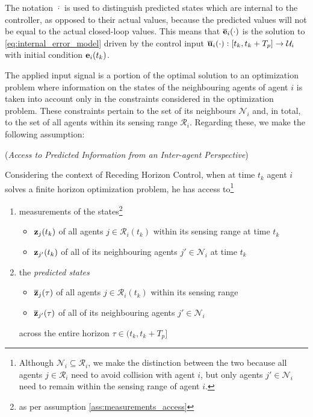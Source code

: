 The notation $\overline{\cdot}$ is used to distinguish predicted states which
are internal to the controller, as opposed to their actual values, because
the predicted values will not be equal to the actual closed-loop values. This
means that $\overline{\bm{\mathbf{e}}}_i(\cdot)$ is the solution to
\eqref{eq:internal_error_model} driven by the control input
$\overline{\bm{\mathbf{u}}}_i(\cdot) : [t_k, t_k + T_p] \to \mathcal{U}_i$ with
initial condition $\bm{\mathbf{e}}_i(t_k)$.

The applied input signal is a portion of the optimal solution to an
optimization problem where information on the states of the neighbouring
agents of agent $i$ is taken into account only in the constraints considered
in the optimization problem. These constraints pertain to the set of its
neighbours $\mathcal{N}_i$ and, in total, to the set of all agents within its
sensing range $\mathcal{R}_i$. Regarding these, we make the following assumption:\\[1ex]

\begin{bw_box}
  \begin{assumption} (\textit{Access to Predicted Information from an
    Inter-agent Perspective})
    \label{ass:access_to_predicted_info_n}

Considering the context of Receding Horizon Control, when
at time $t_k$ agent $i$ solves a finite horizon optimization problem, he has
access to\footnote{Although
  $\mathcal{N}_i \subseteq \mathcal{R}_i$, we make the distinction between
  the two because all agents $j \in \mathcal{R}_i$ need to avoid collision
  with agent $i$, but only agents $j' \in \mathcal{N}_i$ need to remain
  within the sensing range of agent $i$.
}

\begin{enumerate}
  \item measurements of the states\footnote{as per assumption
    \eqref{ass:measurements_access}}
    \begin{itemize}
      \item $\bm{\mathbf{z}}_j(t_k)$ of all agents $j \in \mathcal{R}_i(t_k)$ within its sensing range at time $t_k$
      \item $\bm{\mathbf{z}}_{j'}(t_k)$ of all of its neighbouring agents $j' \in \mathcal{N}_i$ at time $t_k$
      \end{itemize}
    \item the \textit{predicted states}
      \begin{itemize}
        \item $\overline{\bm{\mathbf{z}}}_j(\tau)$ of all agents $j \in \mathcal{R}_i(t_k)$ within its sensing range
        \item $\overline{\bm{\mathbf{z}}}_{j'}(\tau)$ of all of its neighbouring agents $j' \in \mathcal{N}_i$
      \end{itemize}
      across the entire horizon $\tau \in (t_k, t_k + T_p]$
\end{enumerate}
\end{assumption}
\end{bw_box}

